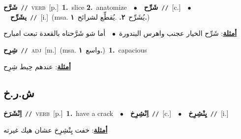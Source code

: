 \documentclass[10pt,a4paper,twoside]{article} %
\begin{document}
\begin{multicols}{2}
{\setlength\topsep{0pt}\textbf{\foreignlanguage{arabic}{شَرَّح}}\ {\color{gray}\texttt{//}\color{black}}\ \textsc{verb}\ [p.]\ \textbf{1.}~slice  \textbf{2.}~anatomize\ \ $\bullet$\ \ \setlength\topsep{0pt}\textbf{\foreignlanguage{arabic}{شَرِّح}}\ {\color{gray}\texttt{//}\color{black}}\ [c.]\ \ $\bullet$\ \ \setlength\topsep{0pt}\textbf{\foreignlanguage{arabic}{يشَرِّح}}\ {\color{gray}\texttt{//}\color{black}}\ [i.]\ \color{gray}(msa. \foreignlanguage{arabic}{يُشَرِّح}~\foreignlanguage{arabic}{\textbf{٢.}}  .\foreignlanguage{arabic}{يُقطِّع لشرائح}~\foreignlanguage{arabic}{\textbf{١.}})\color{black}\  \begin{flushright}\color{gray}\foreignlanguage{arabic}{\textbf{\underline{\foreignlanguage{arabic}{أمثلة}}}: شَرِّح الخيار عجنب واهرس البندورة\ $\bullet$\ \  أما شو شَرَّحناه بالقعدة تبعت امبارح}\end{flushright}\color{black}} \vspace{2mm}

{\setlength\topsep{0pt}\textbf{\foreignlanguage{arabic}{شِرِح}}\ {\color{gray}\texttt{//}\color{black}}\ \textsc{adj}\ [m.]\ \color{gray}(msa. \foreignlanguage{arabic}{واسع}~\foreignlanguage{arabic}{\textbf{١.}})\color{black}\ \textbf{1.}~capacious\  \begin{flushright}\color{gray}\foreignlanguage{arabic}{\textbf{\underline{\foreignlanguage{arabic}{أمثلة}}}: عندهم حِيط شِرِح}\end{flushright}\color{black}} \vspace{2mm}

\vspace{-3mm}
\subsection*{\color{blue}\foreignlanguage{arabic}{ش.ر.خ}\color{blue}{}} 

{\setlength\topsep{0pt}\textbf{\foreignlanguage{arabic}{اِنْشَرَخ}}\ {\color{gray}\texttt{//}\color{black}}\ \textsc{verb}\ [p.]\ \textbf{1.}~have a crack\ \ $\bullet$\ \ \setlength\topsep{0pt}\textbf{\foreignlanguage{arabic}{اِنْشِرِخ}}\ {\color{gray}\texttt{//}\color{black}}\ [c.]\ \ $\bullet$\ \ \setlength\topsep{0pt}\textbf{\foreignlanguage{arabic}{يِنْشِرِخ}}\ {\color{gray}\texttt{//}\color{black}}\ [i.]\  \begin{flushright}\color{gray}\foreignlanguage{arabic}{\textbf{\underline{\foreignlanguage{arabic}{أمثلة}}}: خفت يِنْشِرِخ عشان هيك غيرته}\end{flushright}\color{black}} \vspace{2mm}


\end{multicols}
\end{document}

